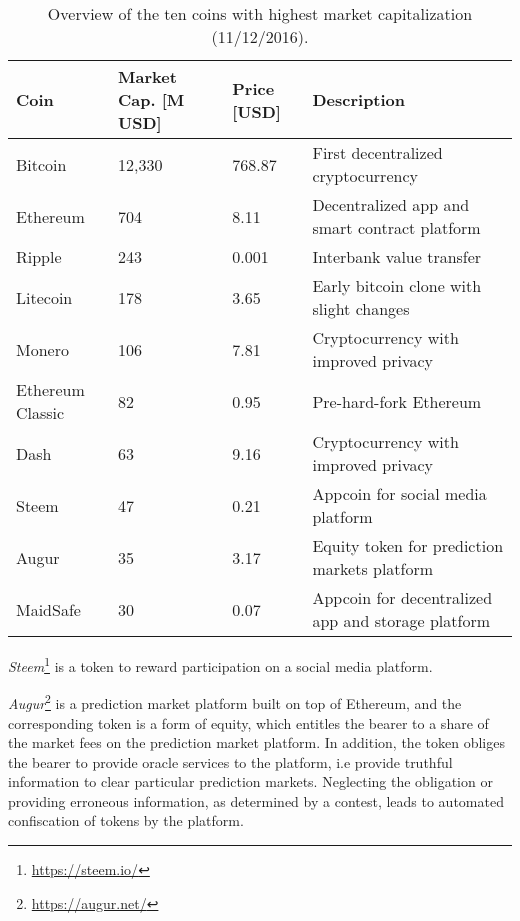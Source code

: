 \begin{table}\footnotesize
  \centering
  \begin{tabularx}{\textwidth}{ p{1.5cm} p{1.8cm} p{1cm} X }
    \toprule
    \textbf{Coin} & \textbf{Market Cap.} \newline \textbf{[M USD]} & \textbf{Price} \newline \textbf{[USD]} & \textbf{Description} \\
    \midrule
    Bitcoin & 12,330 & 768.87 & First decentralized cryptocurrency \\
    Ethereum & 704 & 8.11 & Decentralized app and smart contract platform \\
    Ripple & 243 & 0.001 & Interbank value transfer \\
    Litecoin & 178 & 3.65 & Early bitcoin clone with slight changes \\
    Monero & 106 & 7.81 & Cryptocurrency with improved privacy \\
    Ethereum \newline Classic & 82 & 0.95 & Pre-hard-fork Ethereum \\
    Dash & 63 & 9.16 & Cryptocurrency with improved privacy  \\
    Steem & 47 & 0.21 & Appcoin for social media platform\\
    Augur & 35 & 3.17 & Equity token for prediction markets platform \\
    MaidSafe & 30 & 0.07 & Appcoin for decentralized app and storage platform \\
    \bottomrule
  \end{tabularx}
  \caption{Overview of the ten coins with highest market capitalization (11/12/2016).}
  \label{tbl:eco:coin}
\end{table}

\emph{Steem}\footnote{\url{https://steem.io/}} is a token to reward participation on a social media platform. 

\emph{Augur}\footnote{\url{https://augur.net/}} is a prediction market platform built on top of Ethereum, and the corresponding token is a form of equity, which entitles the bearer to a share of the market fees on the prediction market platform. In addition, the token obliges the bearer to provide oracle services to the platform, i.e provide truthful information to clear particular prediction markets. Neglecting the obligation or providing erroneous information, as determined by a contest, leads to automated confiscation of tokens by the platform. 

